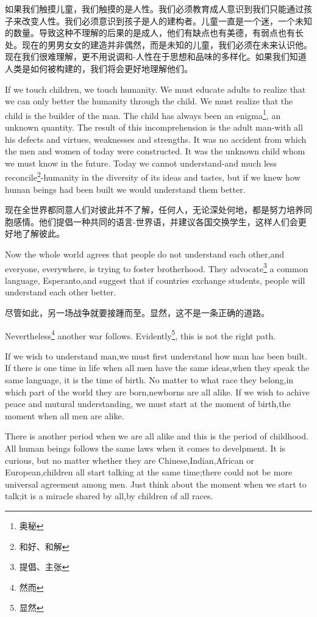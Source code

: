 \documentclass[lang=cn,10pt]{elegantbook}
\begin{document}
如果我们触摸儿童，我们触摸的是人性。我们必须教育成人意识到我们只能通过孩子来改变人性。我们必须意识到孩子是人的建构者。儿童一直是一个迷，一个未知的数量。导致这种不理解的后果的是成人，他们有缺点也有美德，有弱点也有长处。现在的男男女女的建造并非偶然，而是未知的儿童，我们必须在未来认识他。现在我们很难理解，更不用说调和-人性在于思想和品味的多样化。如果我们知道人类是如何被构建的，我们将会更好地理解他们。

If we touch children, we touch humanity. We must educate adults to realize that we can only better the humanity through the child. We must realize that the child is the builder of the man. The child has always been an enigma\footnote{奥秘}, an unknown quantity. The result of this incomprehension is the adult man-with all his defects and virtues, weaknesses and strengths. It was no accident from which the men and women of today were constructed. It was the unknown child whom we must know in the future. Today we cannot understand-and much less reconcile\footnote{和好、和解}-humanity in the diversity of its ideas and tastes, but if we knew how human beings had been built we would understand them better.

现在全世界都同意人们对彼此并不了解，任何人，无论深处何地，都是努力培养同胞感情。他们提倡一种共同的语言-世界语，并建议各国交换学生，这样人们会更好地了解彼此。

Now the whole world agrees that people do not understand each other,and everyone, everywhere, is trying to foster brotherhood. They advocate\footnote{提倡、主张} a common language, Esperanto,and suggest that if countries exchange students, people will understand each other better.

尽管如此，另一场战争就要接踵而至。显然，这不是一条正确的道路。

Nevertheless\footnote{然而} another war follows. Evidently\footnote{显然}, this is not the right path.

If we wish to understand man,we must first understand how man has been built. If there is one time in life when all men have the same ideas,when they speak the same language, it is the time of birth. No matter to what race they belong,in which part of the world they are born,newborns are all alike. If we wish to achive peace and mutural understanding, we must start at the moment of birth,the moment when all men are alike.

There is another period when we are all alike and this is the period of childhood. All human beings follows the same laws when it comes to develpment. It is curious, but no matter whether they are Chinese,Indian,African or European,children all start talking at the same time;there could not be more universal agreement among men. Just think about the moment when we start to talk;it is a miracle shared by all,by children of all races.
\end{document}
